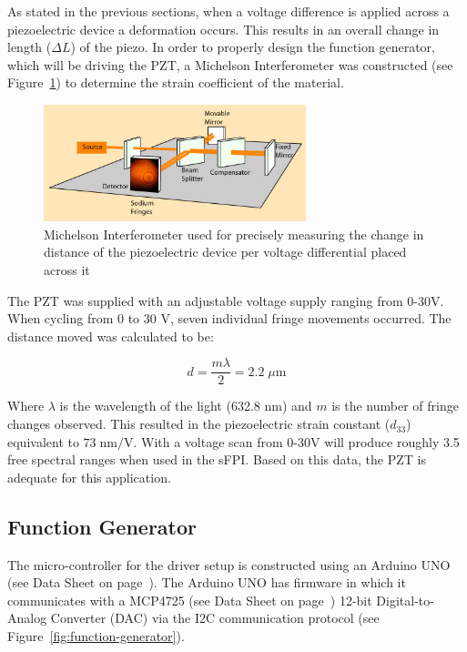 \documentclass[12pt,journal]{IEEEtran}
\begin{document}
As stated in the previous sections, when a voltage difference is applied across a piezoelectric device a deformation occurs. This results in an overall change in length ($\Delta L$) of the piezo. In order to properly design the function generator, which will be driving the PZT, a Michelson Interferometer was constructed (see Figure~\ref{fig:michelson-interferometer}) to determine the strain coefficient of the material. 

\begin{figure}
\centering
	\includegraphics[width=3in]{./michelson.png}
	\caption[Michelson Interferometer]{Michelson Interferometer used for precisely measuring the change in distance of the piezoelectric device per voltage differential placed across it~\cite{michelson}}
	\label{fig:michelson-interferometer}
\end{figure}

The PZT was supplied with an adjustable voltage supply ranging from 0-30V. When cycling from 0 to 30 V, seven individual fringe movements occurred. The distance moved was calculated to be:

\begin{equation}
d = \frac{m\lambda}{2} = 2.2 \;\mu \text{m}
\end{equation}

Where $\lambda$ is the wavelength of the light (632.8 nm) and $m$ is the number of fringe changes observed. This resulted in the piezoelectric strain constant ($d_{33}$) equivalent to $73 \;\text{nm/V}$. With a voltage scan from 0-30V will produce roughly 3.5 free spectral ranges when used in the sFPI. Based on this data, the PZT is adequate for this application.


\subsection{Function Generator}

The micro-controller for the driver setup is constructed using an Arduino UNO (see Data Sheet on page~\pageref{datasheet:arduino_uno}). The Arduino UNO has firmware in which it communicates with a MCP4725 (see Data Sheet on page~\pageref{datasheet:mcp4725}) 12-bit Digital-to-Analog Converter (DAC) via the I2C communication protocol (see Figure~\ref{fig:function-generator}).
\end{document}
